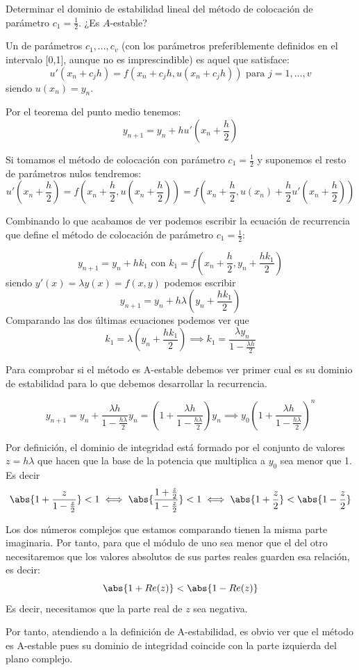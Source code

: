 \begin{problem}[1]
Determinar el dominio de estabilidad lineal del método de colocación de parámetro $c_1=\frac{1}{2}$. ¿Es $A$-estable?
\solution

Un  de parámetros $c_1,...,c_v$ (con los parámetros preferiblemente definidos en el intervalo [0,1], aunque no es imprescindible) es aquel que satisface:
\[u'(x_n+c_jh)=f(x_n+c_jh,u(x_n+c_jh)) \text{ para } j=1,...,v\]
siendo $u(x_n)=y_n$.

Por el teorema del punto medio tenemos:
\[y_{n+1}=y_n+hu'\left(x_n+\frac{h}{2}\right)\]

Si tomamos el método de colocación con parámetro $c_1=\frac{1}{2}$ y suponemos el resto de parámetros nulos tendremos:
\[u'\left(x_n+\frac{h}{2}\right)=f\left(x_n+\frac{h}{2},u\left(x_n+\frac{h}{2}\right)\right) =f\left(x_n+\frac{h}{2},u(x_n) + \frac{h}{2}u'\left(x_n+\frac{h}{2}\right)\right)\]

Combinando lo que acabamos de ver podemos escribir la ecuación de recurrencia que define el método de colocación de parámetro $c_1=\frac{1}{2}$:

\[y_{n+1} = y_n + hk_1 \text{ con } k_1 = f\left( x_n +\frac{h}{2}, y_n + \frac{hk_1}{2}\right)\]
siendo $y'(x)=λy(x)=f(x,y)$ podemos escribir
\[y_{n+1} = y_n + hλ\left(y_n+\frac{hk_1}{2}\right)\]
Comparando las dos últimas ecuaciones podemos ver que
\[k_1 = λ\left( y_n + \frac{hk_1}{2}\right) \implies k_1 = \frac{λy_n}{1-\frac{λh}{2}}\]

Para comprobar si el método es A-estable debemos ver primer cual es su dominio de estabilidad para lo que debemos desarrollar la recurrencia.

\[y_{n+1} = y_n + \frac{λh}{1-\frac{hλ}{2}}y_n = \left(1+ \frac{λh}{1-\frac{hλ}{2}}\right)y_n \implies y_0\left(1+ \frac{λh}{1-\frac{hλ}{2}}\right)^n\]

Por definición, el dominio de integridad está formado por el conjunto de valores $z=hλ$ que hacen que la base de la potencia que multiplica a $y_0$ sea menor que 1. Es decir
\[\abs{1+\frac{z}{1-\frac{z}{2}}} < 1 \iff \abs{\frac{1+\frac{z}{2}}{1-\frac{z}{2}}} < 1 \iff \abs{1+\frac{z}{2}} < \abs{1-\frac{z}{2}}\]

Los dos números complejos que estamos comparando tienen la misma parte imaginaria. Por tanto, para que el módulo de uno sea menor que el del otro necesitaremos que los valores absolutos de sus partes reales guarden esa relación, es decir:
\[\abs{1+Re(z)} < \abs{1 - Re(z)}\]
Es decir, necesitamos que la parte real de $z$ sea negativa.

Por tanto, atendiendo a la definición de A-estabilidad, es obvio ver que el método es A-estable pues su dominio de integridad coincide con la parte izquierda del plano complejo.
\end{problem}

